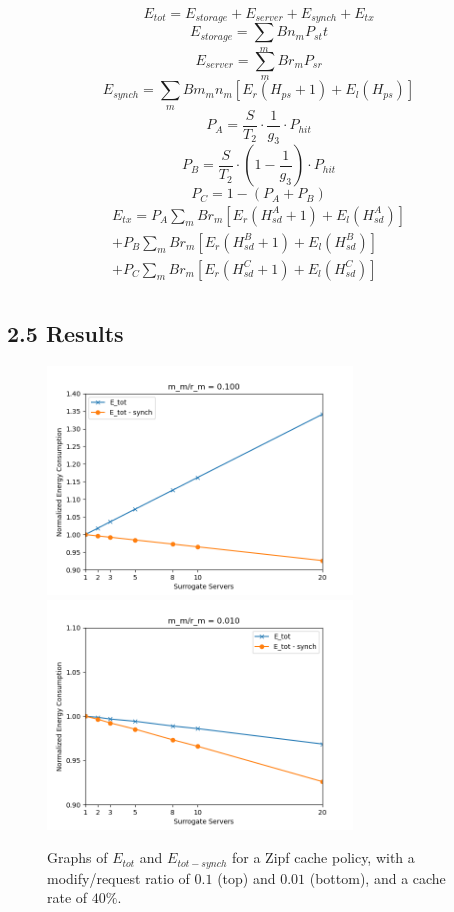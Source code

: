 \documentclass[
	a4paper, %
	10pt, %
	unnumberedsections, %
	twoside, %
]{LTJournalArticle}
\begin{document}
\normalsize
\[E_{tot} = E_{storage} + E_{server} + E_{synch} + E_{tx}\]
\[E_{storage} = \sum_mBn_mP_{st}t\]
\[E_{server} = \sum_mBr_mP_{sr}\]
\[E_{synch} = \sum_mBm_mn_m[E_r(H_{ps} + 1) + E_l(H_{ps})]\]
\[P_A = \frac{S}{T_2} \cdot \frac{1}{g_3} \cdot P_{hit}\]
\[P_B = \frac{S}{T_2} \cdot \left(1 - \frac{1}{g_3}\right) \cdot P_{hit}\]
\[P_C = 1 - (P_A + P_B)\]
\begin{multline*}
    E_{tx} = P_A\sum_mBr_m[E_r(H^A_{sd} + 1) + E_l(H^A_{sd})] \\
      + P_B\sum_mBr_m[E_r(H^B_{sd} + 1) + E_l(H^B_{sd})] \\
      + P_C\sum_mBr_m[E_r(H^C_{sd} + 1) + E_l(H^C_{sd})] \\
\end{multline*}

\subsection{2.5  Results}
\begin{figure}[h]
	\begin{center}
		\includegraphics[width=8.1cm]{plots/sc40ratio0.1zipf.png}
            \includegraphics[width=8.1cm]{plots/sc40ratio0.01zipf.png}
	\end{center}
	\caption{Graphs of $E_{tot}$ and $E_{tot - synch}$ for a Zipf cache policy, with a modify/request ratio of $0.1$ (top) and $0.01$ (bottom), and a cache rate of $40\%$.}	
\end{figure}
\end{document}
